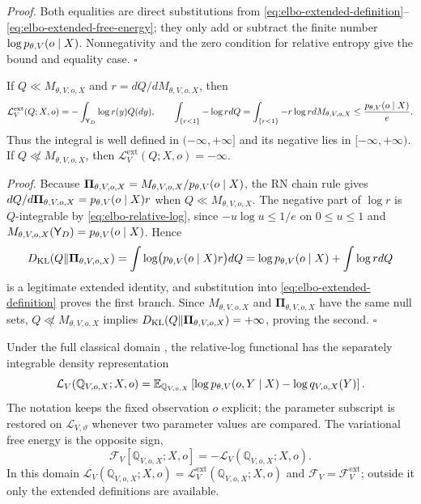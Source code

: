 \emph{Proof.} Both equalities are direct substitutions from \eqref{eq:elbo-extended-definition}--\eqref{eq:elbo-extended-free-energy}; they only add or subtract the finite number \(\log p_{\theta,V}(o\mid X)\). Nonnegativity and the zero condition for relative entropy give the bound and equality case. \hfill\(\square\)

\medskip
{}
If $Q\ll M_{\theta,V,o,X}$ and \(r=dQ/dM_{\theta,V,o,X}\), then
\begin{equation}
\mathcal L_V^{\mathrm{ext}}(Q;X,o)
=-\int_{\mathsf Y_D}\log r(y)Q(dy),
\qquad
\int_{\{r<1\}}-\log r dQ
=\int_{\{r<1\}}-r\log r dM_{\theta,V,o,X}
\leq\frac{p_{\theta,V}(o\mid X)}{e}.
\label{eq:elbo-relative-log}
\end{equation}
Thus the integral is well defined in $(-\infty,+\infty]$ and its negative lies in $[-\infty,+\infty)$. If \(Q\not\ll M_{\theta,V,o,X}\), then \(\mathcal L_V^{\mathrm{ext}}(Q;X,o)=-\infty\). 

\emph{Proof.} Because \(\boldsymbol\Pi_{\theta,V,o,X}=M_{\theta,V,o,X}/p_{\theta,V}(o\mid X)\), the RN chain rule gives \(dQ/d\boldsymbol\Pi_{\theta,V,o,X}=p_{\theta,V}(o\mid X)r\) when \(Q\ll M_{\theta,V,o,X}\). The negative part of \(\log r\) is \(Q\)-integrable by \eqref{eq:elbo-relative-log}, since \(-u\log u\leq1/e\) on \(0\leq u\leq1\) and \(M_{\theta,V,o,X}(\mathsf Y_D)=p_{\theta,V}(o\mid X)\). Hence
\[
D_{\mathrm{KL}}(Q\Vert\boldsymbol\Pi_{\theta,V,o,X})
=\int\log\bigl(p_{\theta,V}(o\mid X)r\bigr)dQ
=\log p_{\theta,V}(o\mid X)+\int\log r dQ
\]
is a legitimate extended identity, and substitution into \eqref{eq:elbo-extended-definition} proves the first branch. Since \(M_{\theta,V,o,X}\) and \(\boldsymbol\Pi_{\theta,V,o,X}\) have the same null sets, \(Q\not\ll M_{\theta,V,o,X}\) implies \(D_{\mathrm{KL}}(Q\Vert\boldsymbol\Pi_{\theta,V,o,X})=+\infty\), proving the second. \hfill$\square$

Under the full classical domain , the relative-log functional has the separately integrable density representation
\begin{equation}
\mathcal L_V(\mathbb Q_{V,o,X};X,o)
=\mathbb E_{\mathbb Q_{V,o,X}}\left[
\log p_{\theta,V}(o,Y\mid X)-\log q_{V,o,X}(Y)
\right].
\label{eq:elbo-definition}
\end{equation}
The notation keeps the fixed observation \(o\) explicit; the parameter subscript is restored on \(\mathcal L_{V,\vartheta}\) whenever two parameter values are compared. The variational free energy is the opposite sign,
\begin{equation}
\mathcal F_V[\mathbb Q_{V,o,X};X,o]
=-\mathcal L_V(\mathbb Q_{V,o,X};X,o).
\label{eq:elbo-free-energy}
\end{equation}
In this domain \(\mathcal L_V(\mathbb Q_{V,o,X};X,o)=\mathcal L_V^{\mathrm{ext}}(\mathbb Q_{V,o,X};X,o)\) and \(\mathcal F_V=\mathcal F_V^{\mathrm{ext}}\); outside it only the extended definitions are available.

